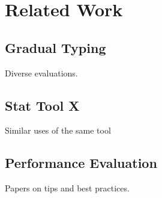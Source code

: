 \section{Related Work}

\subsection{Gradual Typing}
Diverse evaluations.

\subsection{Stat Tool X}
Similar uses of the same tool

\subsection{Performance Evaluation}
Papers on tips and best practices.
